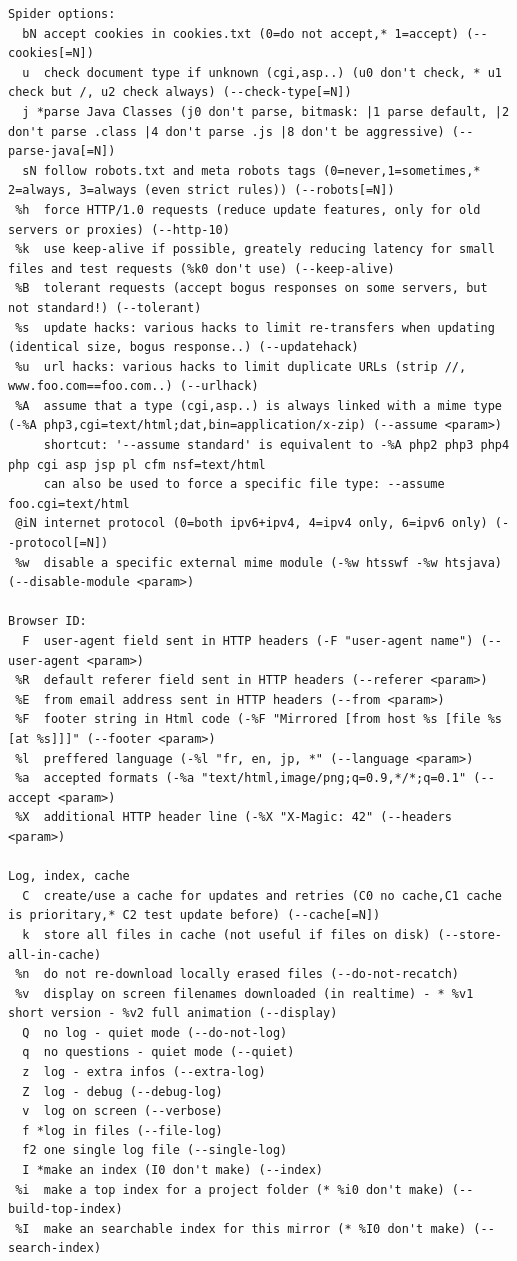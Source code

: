 \documentclass{article}
\begin{document}
\begin{lstlisting}
Spider options:
  bN accept cookies in cookies.txt (0=do not accept,* 1=accept) (--cookies[=N])
  u  check document type if unknown (cgi,asp..) (u0 don't check, * u1 check but /, u2 check always) (--check-type[=N])
  j *parse Java Classes (j0 don't parse, bitmask: |1 parse default, |2 don't parse .class |4 don't parse .js |8 don't be aggressive) (--parse-java[=N])
  sN follow robots.txt and meta robots tags (0=never,1=sometimes,* 2=always, 3=always (even strict rules)) (--robots[=N])
 %h  force HTTP/1.0 requests (reduce update features, only for old servers or proxies) (--http-10)
 %k  use keep-alive if possible, greately reducing latency for small files and test requests (%k0 don't use) (--keep-alive)
 %B  tolerant requests (accept bogus responses on some servers, but not standard!) (--tolerant)
 %s  update hacks: various hacks to limit re-transfers when updating (identical size, bogus response..) (--updatehack)
 %u  url hacks: various hacks to limit duplicate URLs (strip //, www.foo.com==foo.com..) (--urlhack)
 %A  assume that a type (cgi,asp..) is always linked with a mime type (-%A php3,cgi=text/html;dat,bin=application/x-zip) (--assume <param>)
     shortcut: '--assume standard' is equivalent to -%A php2 php3 php4 php cgi asp jsp pl cfm nsf=text/html
     can also be used to force a specific file type: --assume foo.cgi=text/html
 @iN internet protocol (0=both ipv6+ipv4, 4=ipv4 only, 6=ipv6 only) (--protocol[=N])
 %w  disable a specific external mime module (-%w htsswf -%w htsjava) (--disable-module <param>)

Browser ID:
  F  user-agent field sent in HTTP headers (-F "user-agent name") (--user-agent <param>)
 %R  default referer field sent in HTTP headers (--referer <param>)
 %E  from email address sent in HTTP headers (--from <param>)
 %F  footer string in Html code (-%F "Mirrored [from host %s [file %s [at %s]]]" (--footer <param>)
 %l  preffered language (-%l "fr, en, jp, *" (--language <param>)
 %a  accepted formats (-%a "text/html,image/png;q=0.9,*/*;q=0.1" (--accept <param>)
 %X  additional HTTP header line (-%X "X-Magic: 42" (--headers <param>)

Log, index, cache
  C  create/use a cache for updates and retries (C0 no cache,C1 cache is prioritary,* C2 test update before) (--cache[=N])
  k  store all files in cache (not useful if files on disk) (--store-all-in-cache)
 %n  do not re-download locally erased files (--do-not-recatch)
 %v  display on screen filenames downloaded (in realtime) - * %v1 short version - %v2 full animation (--display)
  Q  no log - quiet mode (--do-not-log)
  q  no questions - quiet mode (--quiet)
  z  log - extra infos (--extra-log)
  Z  log - debug (--debug-log)
  v  log on screen (--verbose)
  f *log in files (--file-log)
  f2 one single log file (--single-log)
  I *make an index (I0 don't make) (--index)
 %i  make a top index for a project folder (* %i0 don't make) (--build-top-index)
 %I  make an searchable index for this mirror (* %I0 don't make) (--search-index)


\end{lstlisting}
\end{document}
